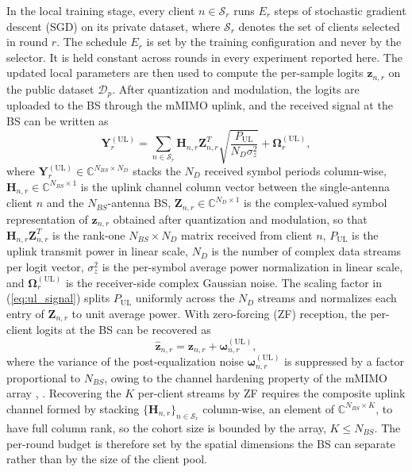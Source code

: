 \documentclass[journal]{IEEEtran}
\newcommand{\rev}[1]{{\color{blue}#1}}
\begin{document}
In the local training stage, every client $n \in \mathcal{S}_r$ runs $E_r$ steps of stochastic gradient descent (SGD) on its private dataset, where $\mathcal{S}_r$ denotes the set of clients selected in round $r$. \rev{The schedule $E_r$ is set by the training configuration and never by the selector. It is held constant across rounds in every experiment reported here.} The updated local parameters are then used to compute the per-sample logits $\bm{z}_{n,r}$ on the public dataset $\mathcal{D}_p$. After quantization and modulation, the logits are uploaded to the BS through the mMIMO uplink, and the received signal at the BS can be written as
\begin{equation}
\bm{Y}^{(\text{UL})}_{r} = \sum_{n \in \mathcal{S}_r} \bm{H}_{n,r} \bm{Z}_{n,r}^{T} \sqrt{\frac{P_{\text{UL}}}{N_D \sigma_z^2}} + \bm{\Omega}^{(\text{UL})}_{r},
\label{eq:ul_signal}
\end{equation}
where $\bm{Y}^{(\text{UL})}_{r} \in \mathbb{C}^{N_{BS} \times N_D}$ stacks the $N_D$ received symbol periods column-wise, $\bm{H}_{n,r} \in \mathbb{C}^{N_{BS} \times 1}$ is the uplink channel column vector between the single-antenna client $n$ and the $N_{BS}$-antenna BS, $\bm{Z}_{n,r} \in \mathbb{C}^{N_D \times 1}$ is the complex-valued symbol representation of $\bm{z}_{n,r}$ obtained after quantization and modulation, so that $\bm{H}_{n,r}\bm{Z}_{n,r}^{T}$ is the rank-one $N_{BS}\times N_D$ matrix received from client $n$, $P_{\text{UL}}$ is the uplink transmit power in linear scale, $N_D$ is the number of complex data streams per logit vector, $\sigma_z^2$ is the per-symbol average power normalization in linear scale, and $\bm{\Omega}^{(\text{UL})}_{r}$ is the receiver-side complex Gaussian noise. The scaling factor in (\ref{eq:ul_signal}) splits $P_{\text{UL}}$ uniformly across the $N_D$ streams and normalizes each entry of $\bm{Z}_{n,r}$ to unit average power. With zero-forcing (ZF) reception, the per-client logits at the BS can be recovered as
\begin{equation}
\hat{\bm{z}}_{n,r} = \bm{z}_{n,r} + \bm{\omega}^{(\text{UL})}_{n,r},
\label{eq:ul_zf}
\end{equation}
where the variance of the post-equalization noise $\bm{\omega}^{(\text{UL})}_{n,r}$ is suppressed by a factor proportional to $N_{BS}$, owing to the channel hardening property of the mMIMO array \cite{mu2024fedtskd}, \cite{vu2020cell}. \rev{Recovering the $K$ per-client streams by ZF requires the composite uplink channel formed by stacking $\{\bm{H}_{n,r}\}_{n \in \mathcal{S}_r}$ column-wise, an element of $\mathbb{C}^{N_{BS} \times K}$, to have full column rank, so the cohort size is bounded by the array, $K \le N_{BS}$. The per-round budget is therefore set by the spatial dimensions the BS can separate rather than by the size of the client pool.}
\end{document}
